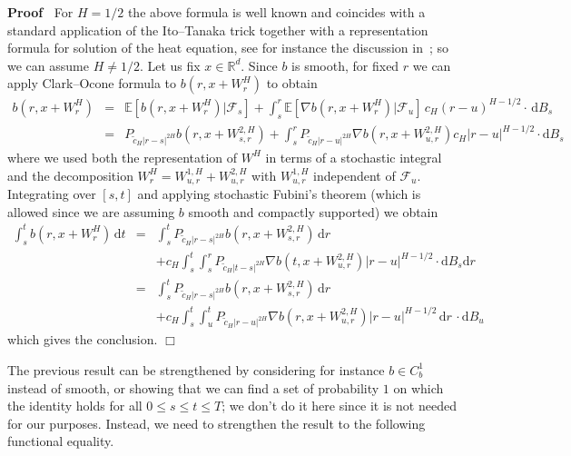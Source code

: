 \documentclass[10pt]{article}
\newcommand{\mathd}{\mathrm{d}}
\newcommand{\nobracket}{}
\newenvironment{proof}{\noindent\textbf{Proof\ }}{\hspace*{\fill}$\Box$\medskip}
\begin{document}
\begin{proof}
  For $H = 1 / 2$ the above formula is well known and coincides with a
  standard application of the Ito--Tanaka trick together with a representation
  formula for solution of the heat equation, see for instance the discussion
  in~{\cite{coutin}}; so we can assume $H \neq 1 / 2$. Let us fix $x \in
  \mathbb{R}^d$. Since $b$ is smooth, for fixed $r$ we can apply Clark--Ocone
  formula to $b (r, x + W^H_r)$ to obtain
  \begin{eqnarray*}
    b (r, x + W^H_r) & = & \mathbb{E} [b (r, x + W^H_r) | \mathcal{F}_s
    \nobracket] + \int_s^r \mathbb{E} [\nabla b (r, x + W^H_r) | \mathcal{F}_u
    \nobracket] \, c_H (r - u)^{H - 1 / 2} \cdot \, \mathd B_s\\
    & = & P_{\tilde{c}_H | r - s |^{2 H}} b (r, x + W^{2, H}_{s, r}) +
    \int_s^r P_{\tilde{c}_H | r - u |^{2 H}} \nabla b (r, x + W^{2, H}_{u, r})
    c_H | r - u |^{H - 1 / 2} \cdot \mathd B_s
  \end{eqnarray*}
  where we used both the representation of $W^H$ in terms of a stochastic
  integral and the decomposition $W^H_r = W^{1, H}_{u, r} + W^{2, H}_{u, r}$
  with $W^{1, H}_{u, r}$ independent of $\mathcal{F}_u$. Integrating over $[s,
  t]$ and applying stochastic Fubini's theorem (which is allowed since we are
  assuming $b$ smooth and compactly supported) we obtain
  \begin{eqnarray*}
    \int_s^t b (r, x + W^H_r) \, \mathd t & = & \int_s^t P_{\tilde{c}_H | r -
    s |^{2 H}} b (r, x + W^{2, H}_{s, r}) \, \mathd r\\
    &  & + c_H \int_s^t \int_s^r P_{\tilde{c}_H | t - s |^{2 H}} \nabla b (t,
    x + W^{2, H}_{u, r}) | r - u |^{H - 1 / 2} \cdot \mathd B_s \mathd r\\
    & = & \int_s^t P_{\tilde{c}_H | r - s |^{2 H}} b (r, x + W^{2, H}_{s, r})
    \, \mathd r\\
    &  & + c_H \int_s^t \int_u^t P_{\tilde{c}_H | r - u |^{2 H}} \nabla b (r,
    x + W^{2, H}_{u, r}) | r - u |^{H - 1 / 2} \, \mathd r \, \cdot \mathd B_u
  \end{eqnarray*}
  which gives the conclusion.
\end{proof}

The previous result can be strengthened by considering for instance $b \in
C_b^1$ instead of smooth, or showing that we can find a set of probability $1$
on which the identity holds for all $0 \leqslant s \leqslant t \leqslant T$;
we don't do it here since it is not needed for our purposes. Instead, we need
to strengthen the result to the following functional equality.
\end{document}
